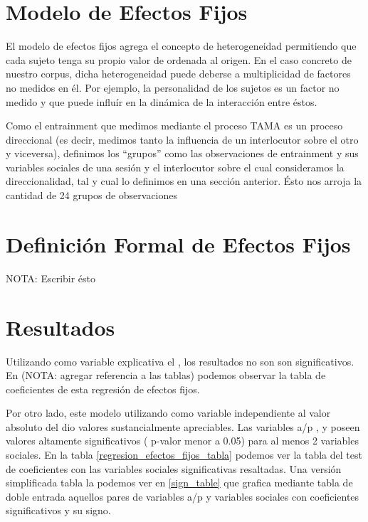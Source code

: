 \section{Modelo de Efectos Fijos}

\newcommand{\slopeestim}[1] { $\estslope \sim #1$ }

El modelo de efectos fijos agrega el concepto de heterogeneidad permitiendo que cada sujeto tenga su propio valor de ordenada al origen. En el caso concreto de nuestro corpus, dicha heterogeneidad puede deberse a multiplicidad de factores no medidos en él. Por ejemplo, la personalidad de los sujetos es un factor no medido y que puede influír en la dinámica de la interacción entre éstos.

Como el entrainment que medimos mediante el proceso TAMA es un proceso direccional (es decir, medimos tanto la influencia de un interlocutor sobre el otro y viceversa), definimos los ``grupos'' como las observaciones de entrainment y sus variables sociales de una sesión y el interlocutor sobre el cual consideramos la direccionalidad, tal y cual lo definimos en una sección anterior. Ésto nos arroja la cantidad de 24 grupos de observaciones



\section{Definición Formal de Efectos Fijos}

NOTA: Escribir ésto

\section{Resultados}

Utilizando como variable explicativa el \entrainment, los resultados no son son significativos. En (NOTA: agregar referencia a las tablas) podemos observar la tabla de coeficientes de esta regresión de efectos fijos.

Por otro lado, este modelo utilizando como variable independiente al valor absoluto del \entrainment dio valores sustancialmente apreciables. Las variables a/p \ENGMAX, \FOMEAN y \NOISETOHARMONICS poseen valores altamente significativos ( p-valor menor a 0.05) para al menos 2 variables sociales. En la tabla \ref{regresion_efectos_fijos_tabla} podemos ver la tabla del test de coeficientes con las variables sociales significativas resaltadas. Una versión simplificada tabla la podemos ver en \ref{sign_table} que grafica mediante tabla de doble entrada aquellos pares de variables a/p y variables sociales con coeficientes significativos y su signo.

